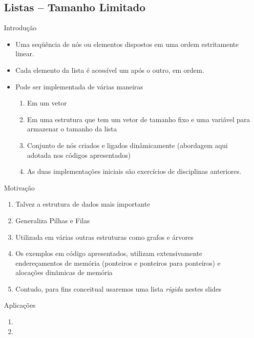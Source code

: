 
\subsection{Listas -- Tamanho Limitado}
  \begin{frame}{Introdução}    
		\begin{itemize}
			\item Uma seqüência de nós ou elementos dispostos em uma ordem estritamente linear.
			\item Cada elemento da lista é acessível um após o outro, em ordem.
			\item Pode ser implementada de várias maneiras			
				\begin{enumerate}
					\item Em um vetor
					\item Em uma estrutura que tem um vetor de tamanho fixo e uma 
					variável para armazenar o tamanho da lista
					\item Conjunto de nós criados e ligados dinâmicamente (abordagem aqui adotada nos códigos apresentados)
					\pause
					\item As duas implementações iniciais são exercícios de disciplinas anteriores.
				\end{enumerate}
		\end{itemize}
  \end{frame}

  \begin{frame}{Motivação}    
	\begin{enumerate}
	\item Talvez a estrutura de dados mais importante
	\item Generaliza Pilhas e Filas
	\item Utilizada em várias outras estruturas como grafos e árvores
	\pause
	\item Os exemplos em código apresentados, utilizam extensivamente 
	endereçamentos de memória (ponteiros e ponteiros para ponteiros) e alocações dinãmicas
	de memória
	\item Contudo, para fins conceitual usaremos uma lista {\em rígida} nestes slides
	\end{enumerate}
	
  \end{frame}
\begin{frame}{Aplicações}    
	\begin{enumerate}
	\item 
	\pause
	\item 
	\end{enumerate}
	
  \end{frame}


